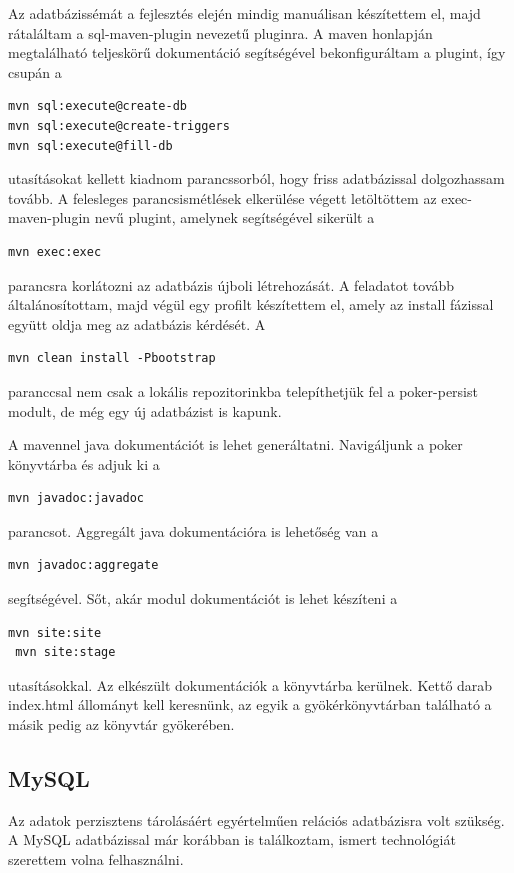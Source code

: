Az adatbázissémát a fejlesztés elején mindig manuálisan készítettem el, majd rátaláltam a sql-maven-plugin nevezetű pluginra. A maven honlapján megtalálható teljeskörű dokumentáció segítségével bekonfiguráltam a plugint, így csupán a
 \begin{Verbatim}[xleftmargin=.5in]
mvn sql:execute@create-db
mvn sql:execute@create-triggers
mvn sql:execute@fill-db
\end{Verbatim}
utasításokat kellett kiadnom parancssorból, hogy friss adatbázissal dolgozhassam tovább. A felesleges parancsismétlések elkerülése végett letöltöttem az exec-maven-plugin nevű plugint, amelynek segítségével sikerült a 
 \begin{Verbatim}[xleftmargin=.5in]
mvn exec:exec
\end{Verbatim}
parancsra korlátozni az adatbázis újboli létrehozását. A feladatot tovább általánosítottam, majd végül egy profilt készítettem el, amely az install fázissal együtt oldja meg az adatbázis kérdését. A 
 \begin{Verbatim}[xleftmargin=.5in]
 mvn clean install -Pbootstrap
 \end{Verbatim}
paranccsal nem csak a lokális repozitorinkba telepíthetjük fel a poker-persist modult, de még egy új adatbázist is kapunk.

A mavennel java dokumentációt is lehet generáltatni. Navigáljunk a poker könyvtárba és adjuk ki a
\begin{Verbatim}[xleftmargin=.5in]
 mvn javadoc:javadoc
\end{Verbatim}
 parancsot. Aggregált java dokumentációra is lehetőség van a 
 \begin{Verbatim}[xleftmargin=.5in]
 mvn javadoc:aggregate
\end{Verbatim}
segítségével. Sőt, akár modul dokumentációt is lehet készíteni a 
\begin{Verbatim}[xleftmargin=.5in]
 mvn site:site
 mvn site:stage
\end{Verbatim}
utasításokkal. Az elkészült dokumentációk a  könyvtárba kerülnek. Kettő darab index.html állományt kell keresnünk, az egyik a gyökérkönyvtárban található a másik pedig az  könyvtár gyökerében.
 
\subsection{MySQL}
Az adatok perzisztens tárolásáért egyértelműen relációs adatbázisra volt szükség. A MySQL adatbázissal már korábban is találkoztam, ismert technológiát szerettem volna felhasználni.

